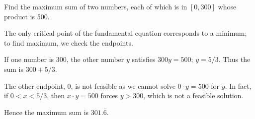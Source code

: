 {Find the maximum sum of two numbers, each of which is in $[0,300]$ whose product is 500.
}
{The only critical point of the fundamental equation corresponds to a minimum; to find maximum, we check the endpoints. 

If one number is 300, the other number $y$ satisfies $300y = 500$; $y = 5/3$. Thus the sum is $300+5/3$. 

The other endpoint, 0, is not feasible as we cannot solve $0\cdot y = 500$ for $y$. In fact, if $0<x<5/3$, then $x\cdot y = 500$ forces $y>300$, which is not a feasible solution. 

Hence the maximum sum is $301.\overline{6}$.
}

